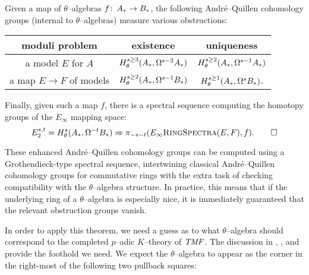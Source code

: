 \begin{theorem}
Given a map of \(\theta\)--algebras \(f\colon\thinspace A_* \to B_*\), the following Andr\'e--Quillen cohomology groups (internal to \(\theta\)--algebras) measure various obstructions:
\begin{center}
\begin{tabular}{@{}ccc@{}} \toprule
moduli problem & existence & uniqueness \\
\midrule
a model \(E\) for \(A\) & \(H^{s \ge 3}_\theta(A_*, \Omega^{s-2} A_*)\) & \(H^{s \ge 2}_\theta(A_*, \Omega^{s-1} A_*)\) \\
a map \(E \to F\) of models & \(H^{s \ge 2}_\theta(A_*, \Omega^{s-1} B_*)\) & \(H^{s \ge 1}_\theta(A_*, \Omega^s B_*)\). \\
 \bottomrule
\end{tabular}
\end{center}
Finally, given such a map \(f\), there is a spectral sequence computing the homotopy groups of the \(E_\infty\) mapping space: \[E_2^{s, t} = H^s_\theta(A_*, \Omega^{-t} B_*) \Rightarrow \pi_{-s-t}(E_\infty\normalfont\textsc{RingSpectra}(E, F), f). \qed\]
\end{theorem}

\begin{remark}
These enhanced Andr\'e--Quillen cohomology groups can be computed using a Grothendieck-type spectral sequence, intertwining classical Andr\'e--Quillen cohomology groups for commutative rings with the extra task of checking compatibility with the \(\theta\)--algebra structure.  In practice, this means that if the underlying ring of a \(\theta\)--algebra is especially nice, it is immediately guaranteed that the relevant obstruction groups vanish.
\end{remark}

In order to apply this theorem, we need a guess as to what \(\theta\)--algebra should correspond to the completed \(p\)--adic \(K\)--theory of \(\mathit{TMF}\).  The discussion in , , and  provide the foothold we need.  We expect the \(\theta\)--algebra to appear as the corner in the right-most of the following two pullback squares:

\begin{center}
\end{center}

